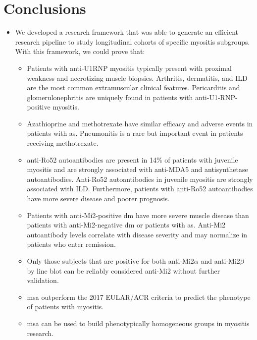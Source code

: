 \chapter{Conclusions}

\begin{itemize}
	
	\item We developed a research framework that was able to generate an efficient research pipeline to study longitudinal cohorts of specific myositis subgroups. With this framework, we could prove that:
	
	\begin{itemize}
		\item Patients with anti-U1RNP myositis typically present with proximal weakness and necrotizing muscle biopsies. Arthritis, dermatitis, and ILD are the most common extramuscular clinical features. Pericarditis and glomerulonephritis are uniquely found in patients with anti-U1-RNP- positive myositis.
		
		\item Azathioprine and methotrexate have similar efficacy and adverse events in patients with \gls{as}. Pneumonitis is a rare but important event in patients receiving methotrexate.
		
		\item anti-Ro52 autoantibodies are present in 14\% of patients with juvenile myositis and are strongly associated with anti-MDA5 and antisynthetase autoantibodies. Anti-Ro52 autoantibodies in juvenile myositis are strongly associated with ILD. Furthermore, patients with anti-Ro52 autoantibodies have more severe disease and poorer prognosis.
		
		\item Patients with anti-Mi2-positive \gls{dm} have more severe muscle disease than patients with anti-Mi2-negative \gls{dm} or patients with \gls{as}. Anti-Mi2 autoantibody levels correlate with disease severity and may normalize in patients who enter remission.
		
		\item Only those subjects that are positive for both anti-Mi2$\alpha$ and anti-Mi2$\beta$ by line blot can be reliably considered anti-Mi2 without further validation.
		
		\item \gls{msa} outperform the 2017 EULAR/ACR criteria to predict the phenotype of patients with myositis.
		
		\item \gls{msa} can be used to build phenotypically homogeneous groups in myositis research.
	\end{itemize}


\end{itemize}
